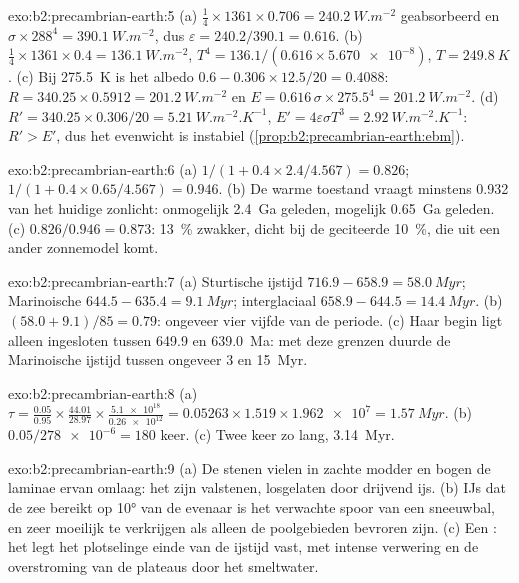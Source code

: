 \begin{solution}{exo:b2:precambrian-earth:5}
(a) $\tfrac14\times1361\times0.706 = \qty{240.2}{W.m^{-2}}$ geabsorbeerd en $\sigma\times288^4 =
\qty{390.1}{W.m^{-2}}$, dus $\varepsilon = 240.2/390.1 = 0.616$. (b) $\tfrac14\times1361\times0.4
= \qty{136.1}{W.m^{-2}}$, $T^4 = 136.1/(0.616\times\num{5.670e-8})$, $T = \qty{249.8}{K}$.
(c) Bij \qty{275.5}{K} is het albedo $0.6 - 0.306\times12.5/20 = 0.4088$: $R = 340.25\times0.5912 =
\qty{201.2}{W.m^{-2}}$ en $E = 0.616\,\sigma\times275.5^4 = \qty{201.2}{W.m^{-2}}$. (d) $R' =
340.25\times0.306/20 = \qty{5.21}{W.m^{-2}.K^{-1}}$, $E' = 4\varepsilon\sigma T^3 =
\qty{2.92}{W.m^{-2}.K^{-1}}$: $R' > E'$, dus het evenwicht is instabiel
(\cref{prop:b2:precambrian-earth:ebm}).
\end{solution}

\begin{solution}{exo:b2:precambrian-earth:6}
(a) $1/(1 + 0.4\times2.4/4.567) = 0.826$; $1/(1 + 0.4\times0.65/4.567) = 0.946$. (b) De warme
toestand vraagt minstens 0.932 van het huidige zonlicht: onmogelijk \qty{2.4}{Ga} geleden, mogelijk
\qty{0.65}{Ga} geleden. (c) $0.826/0.946 = 0.873$: \qty{13}{\percent} zwakker, dicht bij de
geciteerde \qty{10}{\percent}, die uit een ander zonnemodel komt.
\end{solution}

\begin{solution}{exo:b2:precambrian-earth:7}
(a) Sturtische ijstijd $716.9 - 658.9 = \qty{58.0}{Myr}$; Marinoische $644.5 - 635.4 = \qty{9.1}{Myr}$;
interglaciaal $658.9 - 644.5 = \qty{14.4}{Myr}$. (b) $(58.0 + 9.1)/85 = 0.79$: ongeveer vier vijfde
van de periode. (c) Haar begin ligt alleen ingesloten tussen 649.9 en \qty{639.0}{Ma}: met deze
grenzen duurde de Marinoische ijstijd tussen ongeveer 3 en \qty{15}{Myr}.
\end{solution}

\begin{solution}{exo:b2:precambrian-earth:8}
(a) $\tau = \frac{0.05}{0.95}\times\frac{44.01}{28.97}\times\frac{\num{5.1e18}}{\num{0.26e12}} =
0.05263\times1.519\times\num{1.962e7} = \qty{1.57}{Myr}$. (b) $0.05/\num{278e-6} = 180$ keer.
(c) Twee keer zo lang, \qty{3.14}{Myr}.
\end{solution}

\begin{solution}{exo:b2:precambrian-earth:9}
(a) De stenen vielen in zachte modder en bogen de laminae ervan omlaag: het zijn valstenen, losgelaten door
drijvend ijs. (b) IJs dat de zee bereikt op \ang{10} van de evenaar is het verwachte spoor van een
sneeuwbal, en zeer moeilijk te verkrijgen als alleen de poolgebieden bevroren zijn. (c) Een :
het legt het plotselinge einde van de ijstijd vast, met intense verwering en de overstroming van de
plateaus door het smeltwater.
\end{solution}

